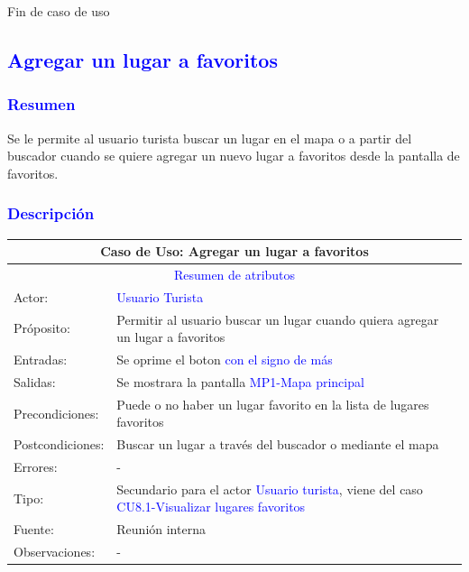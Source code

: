 Fin de caso de uso



\pagebreak
\subsection{\textcolor{blue}{Agregar un lugar a favoritos}}
\subsubsection{\textcolor{blue}{Resumen}}
 Se le permite al usuario turista buscar un lugar en el mapa o a partir del buscador cuando se quiere agregar un nuevo lugar a favoritos desde la pantalla de favoritos.
\subsubsection{\textcolor{blue}{Descripción}}
\begin{tabularx}{16cm}{||l|X||}
	\hline
	\multicolumn{2}{||c||}{Caso de Uso: Agregar un lugar a favoritos} \\
	\hline
	\multicolumn{2}{||c||}{\textcolor{blue}{Resumen de atributos}} \\
	\hline
	{Actor:} & {\textcolor{blue}{Usuario Turista}} \\
	\hline
	{Próposito:} & {Permitir al usuario buscar un lugar cuando quiera agregar un lugar a favoritos} \\
	\hline
	{Entradas:} & {Se oprime el boton \textcolor{blue}{con el signo de más}}\\
	\hline
	{Salidas:} & {Se mostrara la pantalla \textcolor{blue}{MP1-Mapa principal}}\\
	\hline
	{Precondiciones:} & {Puede o no haber un lugar favorito en la lista de lugares favoritos}\\ 
	\hline
	{Postcondiciones:} & {Buscar un lugar a través del buscador o mediante el mapa}\\
	\hline
	{Errores:} & {-} \\
	\hline
	{Tipo:} & {Secundario para el actor \textcolor{blue}{Usuario turista}, viene del caso \textcolor{blue}{CU8.1-Visualizar lugares favoritos}}\\
	\hline
	{Fuente:} & {Reunión interna} \\
	\hline
	{Observaciones:} & {-} \\
	\hline
\end{tabularx}

